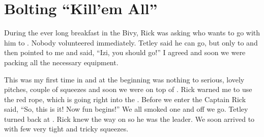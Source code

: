 \section{Bolting ``Kill'em All''}


During the ever long breakfast in the Bivy, Rick was asking who wants to
go with him to . Nobody volunteered immediately. Tetley
said he can go, but only to  and then pointed to me and
said, ``Izi, you should go!'' I agreed and soon we were packing all the
necessary equipment.

This was my first time in  and at the beginning was nothing to
serious, lovely pitches, couple of squeezes and soon we were on top of
. Rick warned me to use the red rope, which is going right into the
. Before we enter the Captain Rick said, ``So, this is
it! Now fun begins!'' We all smoked one and off we go. Tetley turned
back at . Rick knew the way on so he was the leader. We
soon arrived to  with few very tight and tricky squeezes.

